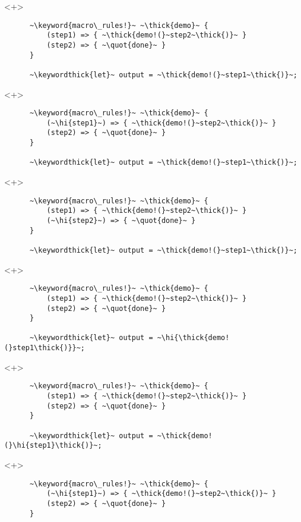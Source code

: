 \documentclass[usepdftitle=false,aspectratio=169]{beamer}
\newcommand{\thick}[1]{\contourlength{0.16pt}\contour[10]{black}{#1}}
\newcommand{\slantbox}[2][.5]
  {%
    \mbox
      {%
        \sbox{\foobox}{#2}%
        \hskip\wd\foobox
        \pdfsave
        \pdfsetmatrix{1 0 #1 1}%
        \llap{\usebox{\foobox}}%
        \pdfrestore
      }%
  }
\newcommand{\backslantbox}[2][.5]
  {%
    \mbox
      {%
        \sbox{\foobox}{#2}%
        \hskip\wd\foobox
        \pdfsave
        \pdfsetmatrix{-1 0 #1 1}%
        \llap{\usebox{\foobox}}%
        \pdfrestore
      }%
  }
\newcommand{\hi}[1]{%
\tikz[baseline=(A.base)]
 \node[highlighting=yellowbg,inner sep=0pt,text depth=0pt] (A) {#1};%
}
\newcommand{\openquote}{\backslantbox[.2]{\hspace{11pt}''\hspace{-11pt}}}
\newcommand{\closequote}{\slantbox[-.2]{\hspace{2pt}''\hspace{-2pt}}}
\newcommand{\blackquote}[1]{\openquote#1\closequote}
\newcommand{\quot}[1]{{\color{redish}\blackquote{#1}}}
\newcommand{\keyword}[1]{\color{greenish}#1}
\newcommand{\keywordthick}[1]{\color{greenish}\contourlength{0.20pt}\contour[10]{greenish}{#1}}
\begin{document}
\begin{frame}[fragile]
  \begin{onlyenv}<+>
    \begin{verbatim}
      ~\keyword{macro\_rules!}~ ~\thick{demo}~ {
          (step1) => { ~\thick{demo!(}~step2~\thick{)}~ }
          (step2) => { ~\quot{done}~ }
      }

      ~\keywordthick{let}~ output = ~\thick{demo!(}~step1~\thick{)}~;
    \end{verbatim}
  \end{onlyenv}
  \begin{onlyenv}<+>
    \begin{verbatim}
      ~\keyword{macro\_rules!}~ ~\thick{demo}~ {
          (~\hi{step1}~) => { ~\thick{demo!(}~step2~\thick{)}~ }
          (step2) => { ~\quot{done}~ }
      }

      ~\keywordthick{let}~ output = ~\thick{demo!(}~step1~\thick{)}~;
    \end{verbatim}
  \end{onlyenv}
  \begin{onlyenv}<+>
    \begin{verbatim}
      ~\keyword{macro\_rules!}~ ~\thick{demo}~ {
          (step1) => { ~\thick{demo!(}~step2~\thick{)}~ }
          (~\hi{step2}~) => { ~\quot{done}~ }
      }

      ~\keywordthick{let}~ output = ~\thick{demo!(}~step1~\thick{)}~;
    \end{verbatim}
  \end{onlyenv}
  \begin{onlyenv}<+>
    \begin{verbatim}
      ~\keyword{macro\_rules!}~ ~\thick{demo}~ {
          (step1) => { ~\thick{demo!(}~step2~\thick{)}~ }
          (step2) => { ~\quot{done}~ }
      }

      ~\keywordthick{let}~ output = ~\hi{\thick{demo!(}step1\thick{)}}~;
    \end{verbatim}
  \end{onlyenv}
  \begin{onlyenv}<+>
    \begin{verbatim}
      ~\keyword{macro\_rules!}~ ~\thick{demo}~ {
          (step1) => { ~\thick{demo!(}~step2~\thick{)}~ }
          (step2) => { ~\quot{done}~ }
      }

      ~\keywordthick{let}~ output = ~\thick{demo!(}\hi{step1}\thick{)}~;
    \end{verbatim}
  \end{onlyenv}
  \begin{onlyenv}<+>
    \begin{verbatim}
      ~\keyword{macro\_rules!}~ ~\thick{demo}~ {
          (~\hi{step1}~) => { ~\thick{demo!(}~step2~\thick{)}~ }
          (step2) => { ~\quot{done}~ }
      }


\end{verbatim}
\end{onlyenv}
\end{frame}
\end{document}
